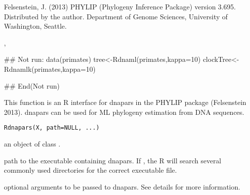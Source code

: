 \documentclass[a4paper]{book}
\begin{document}
%
\begin{References}\relax
Felsenstein, J. (2013) PHYLIP (Phylogeny Inference Package) version 3.695. Distributed by the author. Department of Genome Sciences, University of Washington, Seattle.
\end{References}
%
\begin{SeeAlso}\relax
{}, 
\end{SeeAlso}
%
\begin{Examples}
\begin{ExampleCode}
## Not run: 
data(primates)
tree<-Rdnaml(primates,kappa=10)
clockTree<-Rdnamlk(primates,kappa=10)

## End(Not run)
\end{ExampleCode}
\end{Examples}
%
\begin{Description}\relax
This function is an R interface for dnapars in the PHYLIP package (Felsenstein 2013). dnapars can be used for ML phylogeny estimation from DNA sequences.
\end{Description}
%
\begin{Usage}
\begin{verbatim}
Rdnapars(X, path=NULL, ...)
\end{verbatim}
\end{Usage}
%
\begin{Arguments}
\begin{ldescription}
\item[\code{X}] an object of class .
\item[\code{path}] path to the executable containing dnapars. If , the R will search several commonly used directories for the correct executable file.
\item[\code{...}] optional arguments to be passed to dnapars. See details for more information.
\end{ldescription}
\end{Arguments}
%
\end{document}
